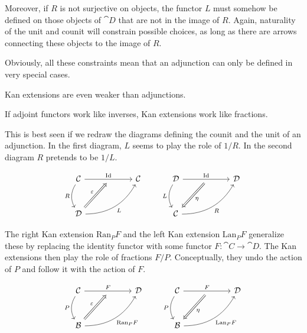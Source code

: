 \documentclass[DaoFP]{subfiles}
\begin{document}
Moreover, if $R$ is not surjective on objects, the functor $L$ must somehow be defined on those objects of $\cat D$ that are not in the image of $R$. Again, naturality of the unit and counit will constrain possible choices, as long as there are arrows connecting these objects to the image of $R$. 

Obviously, all these constraints mean that an adjunction can only be defined in very special cases. 

Kan extensions are even weaker than adjunctions. 

If adjoint functors work like inverses, Kan extensions work like fractions. 

This is best seen if we redraw the diagrams defining the counit and the unit of an adjunction. In the first diagram, $L$ seems to play the role of $1/R$. In the second diagram $R$ pretends to be $1/L$.

\[
 \begin{tikzcd} [row sep=1cm, column sep=1cm]
 \cat C
 \arrow[rr, "\text{Id}", "" {name=ID, below} ]
 \arrow[d, bend right, "R"']
 && \cat C
 \\
 \cat D
  \arrow[urr, bend right, "L"']
 \arrow[Rightarrow, "\varepsilon",  to=ID]
 \end{tikzcd}
 \qquad
 \begin{tikzcd} [row sep=1cm, column sep=1cm]
 \cat D
 \arrow[rr, "\text{Id}", "" {name=ID, below} ]
 \arrow[d, bend right, "L"']
 && \cat D
 \\
 \cat C
  \arrow[urr, bend right, "R"']
 \arrow[Rightarrow, "\eta",  from=ID]
 \end{tikzcd}
\]

The right Kan extension $\text{Ran}_P F$ and the left Kan extension $\text{Lan}_P F$ generalize these by replacing the identity functor with some functor $F \colon \cat C \to \cat D$. The Kan extensions then play the role of fractions $F/P$. Conceptually, they undo the action of $P$ and follow it with the action of $F$.

\[
 \begin{tikzcd} [row sep=1cm, column sep=1cm]
 \cat C
 \arrow[rr, "F", "" {name=ID, below} ]
 \arrow[d, bend right, "P"']
 && \cat D
 \\
 \cat B
  \arrow[urr, bend right, "\text{Ran}_P F"']
 \arrow[Rightarrow, "\varepsilon",  to=ID]
 \end{tikzcd}
 \qquad
 \begin{tikzcd} [row sep=1cm, column sep=1cm]
 \cat C
 \arrow[rr, "F", "" {name=ID, below} ]
 \arrow[d, bend right, "P"']
 && \cat D
 \\
 \cat B
  \arrow[urr, bend right, "\text{Lan}_P F"']
 \arrow[Rightarrow, "\eta",  from=ID]
 \end{tikzcd}
\]
\end{document}
